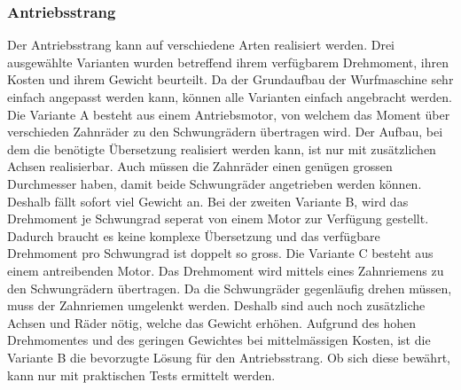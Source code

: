 \subsubsection{Antriebsstrang}
Der Antriebsstrang kann auf verschiedene Arten realisiert werden. Drei ausgewählte Varianten wurden
betreffend ihrem verfügbarem Drehmoment, ihren Kosten und ihrem Gewicht beurteilt. Da der Grundaufbau
der Wurfmaschine sehr einfach angepasst werden kann, können alle Varianten einfach angebracht werden.
Die Variante A besteht aus einem Antriebsmotor, von welchem das Moment über verschieden Zahnräder zu den
Schwungrädern übertragen wird. Der Aufbau, bei dem die benötigte Übersetzung realisiert werden kann, ist
nur mit zusätzlichen Achsen realisierbar. Auch müssen die Zahnräder einen genügen grossen Durchmesser
haben, damit beide Schwungräder angetrieben werden können. Deshalb fällt sofort viel Gewicht an. Bei der
zweiten Variante B, wird das Drehmoment je Schwungrad seperat von einem Motor zur Verfügung gestellt.
Dadurch braucht es keine komplexe Übersetzung und das verfügbare Drehmoment pro Schwungrad ist doppelt
so gross. Die Variante C besteht aus einem antreibenden Motor. Das Drehmoment wird mittels eines
Zahnriemens zu den Schwungrädern übertragen. Da die Schwungräder gegenläufig drehen müssen, muss der
Zahnriemen umgelenkt werden. Deshalb sind auch noch zusätzliche Achsen und Räder nötig, welche das
Gewicht erhöhen. Aufgrund des hohen Drehmomentes und des geringen Gewichtes bei mittelmässigen Kosten,
ist die Variante B die bevorzugte Lösung für den Antriebsstrang. Ob sich diese bewährt, kann nur mit
praktischen Tests ermittelt werden.
